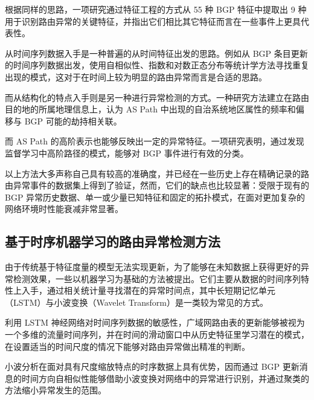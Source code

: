 根据同样的思路，一项研究通过特征工程的方式从 55 种 BGP 特征中提取出 9 种用于识别路由异常的关键特征，并指出它们相比其它特征而言在一些事件上更具代表性。 %

从时间序列数据入手是一种普遍的从时间特征出发的思路。例如从 BGP 条目更新的时间序列数据出发，使用自相似性、指数和对数正态分布等统计学方法寻找重复出现的模式，这对于在时间上较为明显的路由异常而言是合适的思路。  %

而从结构化的特点入手则是另一种进行异常检测的方式。一种研究方法建立在路由目的地的所属地理信息上，认为 AS Path 中出现的自治系统地区属性的频率和偏移与 BGP 可能的劫持相关联。 %

而 AS Path 的高阶表示也能够反映出一定的异常特征。一项研究表明，通过发现监督学习中高阶路径的模式，能够对 BGP 事件进行有效的分类。 %

以上方法大多声称自己具有较高的准确度，并已经在一些历史上存在精确记录的路由异常事件的数据集上得到了验证，然而，它们的缺点也比较显著：受限于现有的 BGP 异常历史数据、单一或少量已知特征和固定的拓扑模式，在面对更加复杂的网络环境时性能衰减非常显著。

\subsection{基于时序机器学习的路由异常检测方法}


由于传统基于特征度量的模型无法实现更新，为了能够在未知数据上获得更好的异常检测效果，一些以机器学习为基础的方法被提出。它们主要从数据的时间序列特性上入手，通过相关统计量寻找潜在的异常时间点，其中长短期记忆单元（LSTM）与小波变换（Wavelet Transform）是一类较为常见的方式。

利用 LSTM 神经网络对时间序列数据的敏感性，广域网路由表的更新能够被视为一个多维的流量时间序列，并在时间的滑动窗口中从历史特征里学习潜在的模式，在设置适当的时间尺度的情况下能够对路由异常做出精准的判断。  %

小波分析在面对具有尺度缩放特点的时序数据上具有优势，因而通过 BGP 更新消息的时间方向自相似性能够借助小波变换对网络中的异常进行识别，并通过聚类的方法缩小异常发生的范围。 %

